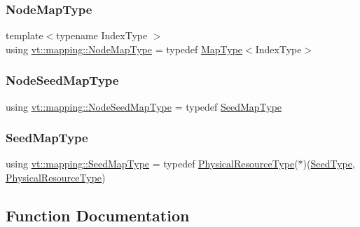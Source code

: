 \subsubsection{\texorpdfstring{Node\+Map\+Type}{NodeMapType}}
{\footnotesize\ttfamily template$<$typename Index\+Type $>$ \\
using \hyperlink{namespacevt_1_1mapping_a8dbe779cb3e28ed8c424bcc8826765b9}{vt\+::mapping\+::\+Node\+Map\+Type} = typedef \hyperlink{namespacevt_1_1mapping_a443f8bb8920af5ae1d3391f61fe492a6}{Map\+Type}$<$Index\+Type$>$}

\mbox{\label{namespacevt_1_1mapping_a84d654b657f2dbe639ada06ae688e4c7}} 
\subsubsection{\texorpdfstring{Node\+Seed\+Map\+Type}{NodeSeedMapType}}
{\footnotesize\ttfamily using \hyperlink{namespacevt_1_1mapping_a84d654b657f2dbe639ada06ae688e4c7}{vt\+::mapping\+::\+Node\+Seed\+Map\+Type} = typedef \hyperlink{namespacevt_1_1mapping_a1c1409d9af8d1ac402af022a65be4a4d}{Seed\+Map\+Type}}

\mbox{\label{namespacevt_1_1mapping_a1c1409d9af8d1ac402af022a65be4a4d}} 
\subsubsection{\texorpdfstring{Seed\+Map\+Type}{SeedMapType}}
{\footnotesize\ttfamily using \hyperlink{namespacevt_1_1mapping_a1c1409d9af8d1ac402af022a65be4a4d}{vt\+::mapping\+::\+Seed\+Map\+Type} = typedef \hyperlink{namespacevt_a2dc36fcada816dc6d11774d650328ee9}{Physical\+Resource\+Type}($\ast$)(\hyperlink{namespacevt_ae2e13198bdef4d5b8e603d6c1c7f0969}{Seed\+Type}, \hyperlink{namespacevt_a2dc36fcada816dc6d11774d650328ee9}{Physical\+Resource\+Type})}



\subsection{Function Documentation}
\mbox{\label{namespacevt_1_1mapping_abaff3ea69ef07a3762befc3628b8b577}} 
